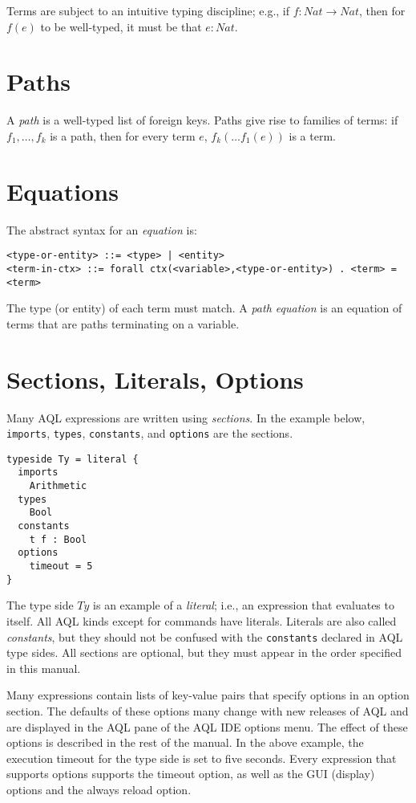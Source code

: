 \documentclass[10pt]{book}
\begin{document}
Terms are subject to an intuitive typing discipline; e.g., if $f : Nat \to Nat$, then for $f(e)$ to be well-typed, it must be that $e : Nat$.

\section{Paths}
A {\it path} is a well-typed list of foreign keys. Paths give rise to families of terms: if $f_1, \ldots, f_k$ is a path, then for every term $e$, $f_k( \ldots f_1(e))$ is a term.

\section{Equations}
The abstract syntax for an {\it equation} is: 
\begin{verbatim}
<type-or-entity> ::= <type> | <entity>
<term-in-ctx> ::= forall ctx(<variable>,<type-or-entity>) . <term> = <term>
\end{verbatim}
The  type (or entity) of each term must match.  A {\it path equation} is an equation of terms that are paths terminating on a variable.

\section{Sections, Literals, Options}
\label{section10}

Many AQL expressions are written using {\it sections}. In the example below, {\tt imports}, {\tt types}, {\tt constants}, and {\tt options} are the sections.
\begin{verbatim}
typeside Ty = literal {
  imports
    Arithmetic
  types
    Bool
  constants
    t f : Bool	
  options
    timeout = 5  
}
\end{verbatim}
The type side $Ty$ is an example of a {\it literal}; i.e., an expression that evaluates to itself.  All AQL kinds except for commands have literals.  Literals are also called {\it constants}, but they should not be confused with the {\tt constants} declared in AQL type sides.  All sections are optional, but they must appear in the order specified in this manual. 

Many expressions contain lists of key-value pairs that specify options in an option section.  The defaults of these options many change with new releases of AQL and are displayed in the AQL pane of the AQL IDE options menu.  The effect of these options is described in the rest of the manual.  In the above example, the execution timeout for the type side is set to five seconds.  Every expression that supports options supports the timeout option, as well as the GUI (display) options and the always reload option.  
\end{document}
